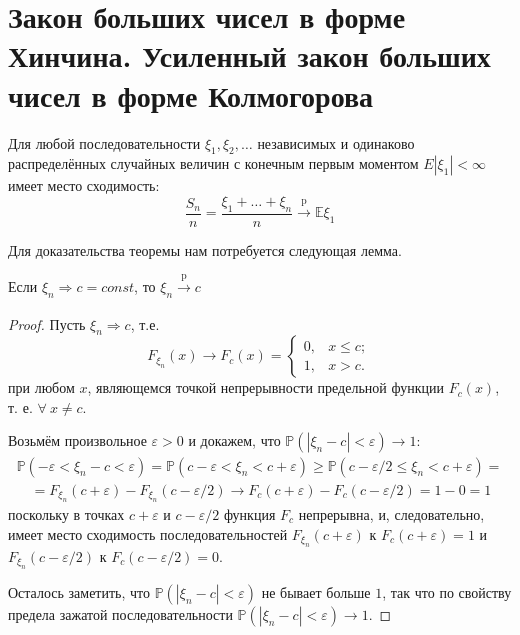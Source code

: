 \section{Закон больших чисел в форме Хинчина. Усиленный закон больших чисел в форме Колмогорова}
\begin{namedthm} \leavevmode

    Для любой последовательности $\xi_{1}, \xi_{2}, \ldots$ независимых и одинаково распределённых случайных величин с конечным первым моментом $E\left|\xi_{1}\right|<\infty$ имеет место сходимость:
    \begin{equation*}
        \frac{S_{n}}{n} = \frac{\xi_{1}+\ldots+\xi_{n}}{n} %
        \stackrel{\text{p}}{\longrightarrow} \mathbb{E}\xi_1
    \end{equation*}
\end{namedthm}
Для доказательства теоремы нам потребуется следующая лемма.
\begin{lem}
    Если $\xi_{n} \Rightarrow c=const$, то $\xi_{n} \xrightarrow[]{\text{p}} c$
\end{lem}
\begin{proof}
    Пусть $\xi_{n} \Rightarrow c$, т.е.
    \begin{equation*}
        F_{\xi_{n}}(x) \rightarrow F_{c}(x) =
        \begin{cases}
            0, & x \leqslant c; \\
            1, & x > c.
        \end{cases}
    \end{equation*}
    при любом $x$, являющемся точкой непрерывности предельной функции $F_{c}(x)$, т. е. $\forall~ x \neq c$.
    
    Возьмём произвольное $\varepsilon>0$ и докажем, что $\mathbb{P}\left(\left|\xi_{n}-c\right|<\varepsilon\right) \rightarrow 1$:
    \begin{multline*}
        \mathbb{P}\left(-\varepsilon<\xi_{n}-c<\varepsilon\right)=\mathbb{P}\left(c-\varepsilon<\xi_{n}<c+\varepsilon\right) \geqslant \mathbb{P}\left(c-\varepsilon / 2 \leqslant \xi_{n}<c+\varepsilon\right)= \\
        \quad=F_{\xi_{n}}(c+\varepsilon)-F_{\xi_{n}}(c-\varepsilon / 2) \rightarrow F_{c}(c+\varepsilon)-F_{c}(c-\varepsilon / 2)=1-0=1
    \end{multline*}
    поскольку в точках $c+\varepsilon$ и $c-\varepsilon / 2$ функция $F_{c}$ непрерывна, и, следовательно, имеет место сходимость последовательностей $F_{\xi_{n}}(c+\varepsilon)$ к $F_{c}(c+\varepsilon)=1$ и $F_{\xi_{n}}(c-\varepsilon / 2)$ к $F_{c}(c-\varepsilon / 2)=0$.
    
    Осталось заметить, что $\mathbb{P}\left(\left|\xi_{n}-c\right|<\varepsilon\right)$ не бывает больше $1$, так что по свойству предела зажатой последовательности $\mathbb{P}\left(\left|\xi_{n}-c\right|<\varepsilon\right) \rightarrow 1$.
\end{proof}

